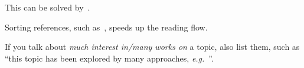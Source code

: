 This can be solved by~\cite{everyman14, roe17, smith14}.

Sorting references, such as~\cite{dijkstra59, everyman14, smith14},
speeds up the reading flow.

If you talk about \emph{much interest in/many works on} a topic, 
also list them, such as ``this topic has been explored by many
approaches, \emph{e.g.}~\cite{dijkstra59, roe17, smith14}''.
